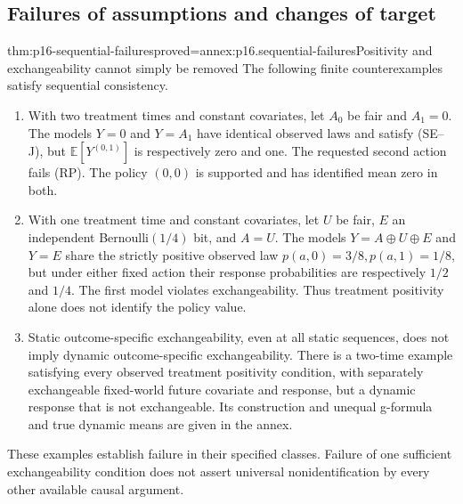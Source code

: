 \subsection{Failures of assumptions and changes of target}

\begin{hbtheorem}{thm:p16-sequential-failures}{proved=annex:p16.sequential-failures}{Positivity and exchangeability cannot simply be removed}
The following finite counterexamples satisfy sequential consistency.
\begin{enumerate}
\item With two treatment times and constant covariates, let \(A_0\) be fair
and \(A_1=0\). The models \(Y=0\) and \(Y=A_1\) have identical
observed laws and satisfy (SE--J), but \(\mathbb E[Y^{(0,1)}]\) is
respectively zero and one. The requested second action fails (RP).
The policy \((0,0)\) is supported and has identified mean zero in both.
\item With one treatment time and constant covariates, let \(U\) be fair,
\(E\) an independent Bernoulli\((1/4)\) bit, and \(A=U\). The models
\(Y=A\mathbin\oplus U\mathbin\oplus E\) and \(Y=E\) share the strictly
positive observed law \(p(a,0)=3/8,p(a,1)=1/8\), but under either fixed
action their response probabilities are respectively \(1/2\) and \(1/4\).
The first model violates exchangeability. Thus treatment positivity alone
does not identify the policy value.
\item Static outcome-specific exchangeability, even at all static sequences,
does not imply dynamic outcome-specific exchangeability. There is a
two-time example satisfying every observed treatment positivity condition,
with separately exchangeable fixed-world future covariate and response,
but a dynamic response that is not exchangeable. Its construction and
unequal g-formula and true dynamic means are given in the annex.
\end{enumerate}
These examples establish failure in their specified classes. Failure of
one sufficient exchangeability condition does not assert universal
nonidentification by every other available causal argument.
\end{hbtheorem}

